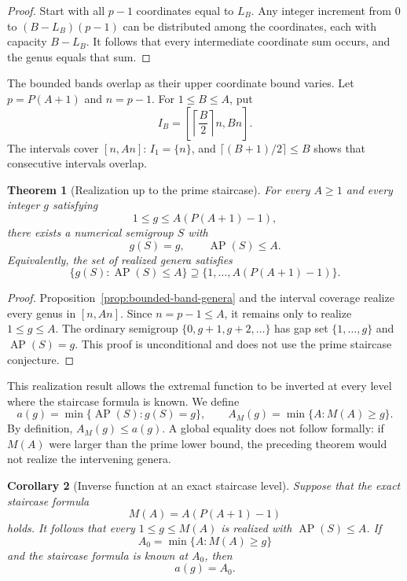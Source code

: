 \documentclass[11pt]{article}
\theoremstyle{plain}
\newtheorem{theorem}{Theorem}[section]
\newtheorem{corollary}[theorem]{Corollary}
\theoremstyle{definition}
\theoremstyle{remark}
\newcommand{\AP}{\operatorname{AP}}
\begin{document}
\begin{proof}
Start with all $p-1$ coordinates equal to $L_B$.  Any integer increment from
$0$ to $(B-L_B)(p-1)$ can be distributed among the coordinates, each with
capacity $B-L_B$.  It follows that every intermediate coordinate sum occurs,
and the genus equals that sum.
\end{proof}

The bounded bands overlap as their upper coordinate bound varies.  Let
$p=P(A+1)$ and $n=p-1$.  For $1\leq B\leq A$, put
\[
  I_B=\left[\left\lceil\frac B2\right\rceil n,Bn\right].
\]
The intervals cover $[n,An]$: $I_1=\{n\}$, and
$\lceil(B+1)/2\rceil\leq B$ shows that consecutive intervals overlap.

\begin{theorem}[Realization up to the prime staircase]
\label{thm:realization-staircase}
For every $A\geq1$ and every integer $g$ satisfying
\[
  1\leq g\leq A(P(A+1)-1),
\]
there exists a numerical semigroup $S$ with
\[
  g(S)=g,
  \qquad \AP(S)\leq A.
\]
Equivalently, the set of realized genera satisfies
\[
  \boxed{\{g(S):\AP(S)\leq A\}
  \supseteq\{1,\ldots,A(P(A+1)-1)\}.}
\]
\end{theorem}

\begin{proof}
Proposition~\ref{prop:bounded-band-genera} and the interval coverage realize
every genus in $[n,An]$.  Since $n=p-1\leq A$, it remains only to realize
$1\leq g\leq A$.  The ordinary semigroup
$\{0,g+1,g+2,\ldots\}$ has gap set $\{1,\ldots,g\}$ and $\AP(S)=g$.
This proof is unconditional and does not use the prime staircase conjecture.
\end{proof}

This realization result allows the extremal function to be inverted at every
level where the staircase formula is known.  We define
\[
  a(g)=\min\{\AP(S):g(S)=g\},
  \qquad
  A_M(g)=\min\{A:M(A)\geq g\}.
\]
By definition, $A_M(g)\leq a(g)$.  A global equality does not follow formally:
if $M(A)$ were larger than the prime lower bound, the preceding theorem would
not realize the intervening genera.

\begin{corollary}[Inverse function at an exact staircase level]
\label{cor:inverse-exact-level}
Suppose that the exact staircase formula
\[
  M(A)=A(P(A+1)-1)
\]
holds.  It follows that every $1\leq g\leq M(A)$ is realized with
$\AP(S)\leq A$.  If
\[
  A_0=\min\{A:M(A)\geq g\}
\]
and the staircase formula is known at $A_0$, then
\[
  \boxed{a(g)=A_0.}
\]
\end{corollary}
\end{document}

